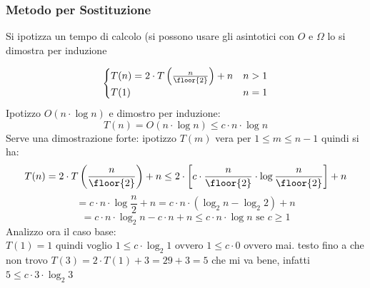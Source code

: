 \documentclass[a4paper,12pt, oneside]{book}
\begin{document}
\begin{shaded}
  \subsubsection{Metodo per Sostituzione}
  Si ipotizza un tempo di calcolo (si possono usare gli
  asintotici con $O$ e $\Omega$ lo si dimostra per induzione
  \begin{esempio}
    $$\begin{cases}
      T(n)=2\cdot T\left(\frac{n}{\floor{2}}\right)+n & n>1 \\
      T(1)                                            & n=1
    \end{cases}
    $$
    Ipotizzo $O(n\cdot \log n)$ e dimostro per induzione:
    $$T(n)=O(n\cdot \log n)\leq c\cdot n\cdot \log n$$
    Serve una dimostrazione forte:
    ipotizzo $T(m)$ vera per $1\leq m\leq n-1$ quindi si ha:
    $$T(n)=2\cdot T\left(\frac{n}{\floor{2}}\right)+n\leq 2\cdot \left[c\cdot \frac{n}{\floor{2}}\cdot \log \frac{n}{\floor{2}}\right]+n$$
    $$=c\cdot n\cdot \log \frac{n}{2}+n=c\cdot n\cdot (\log_2 n-\log_2 2)+n$$
    $$=c\cdot n\cdot \log_2 n-c\cdot n+n\leq c\cdot n\cdot \log n \mbox{ se } c\geq 1$$
    \newpage
    Analizzo ora il caso base:\\
    $T(1)=1$ quindi voglio $1\leq c\cdot \log_2 1$ ovvero $1\leq c\cdot 0$ ovvero mai.
    testo fino a che non trovo $T(3)=2\cdot T(1)+3=29+3=5$ che mi va bene, infatti $5\leq c\cdot 3\cdot \log_2 3$
  \end{esempio}

\end{shaded}
\end{document}

